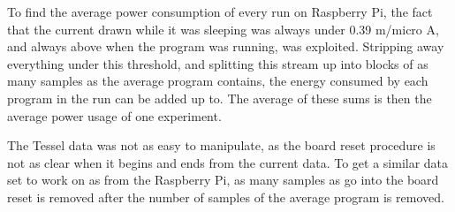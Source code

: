 To find the average power consumption of every run on Raspberry Pi, the fact that the current drawn while it was sleeping was always under 0.39 m/micro A, and always above when the program was running, was exploited. Stripping away everything under this threshold, and splitting this stream up into blocks of as many samples as the average program contains, the energy consumed by each program in the run can be added up to. The average of these sums is then the average power usage of one experiment.

The Tessel data was not as easy to manipulate, as the board reset procedure is not as clear when it begins and ends from the current data. To get a similar data set to work on as from the Raspberry Pi, as many samples as go into the board reset is removed after the number of samples of the average program is removed. 


